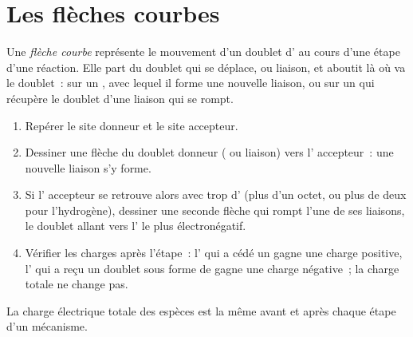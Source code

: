 \section{Les flèches courbes}

\begin{definition}\label{def:g12:curly-arrows:curly-arrow}
Une \emph{flèche courbe} représente le mouvement
d'un doublet d' au cours d'une étape d'une réaction. Elle part
du doublet qui se déplace,  ou liaison, et aboutit là
où va le doublet~: sur un , avec lequel il forme une nouvelle
liaison, ou sur un  qui récupère le doublet d'une liaison qui se
rompt.
\end{definition}

\begin{method}\label{met:g12:curly-arrows:drawing}
\begin{enumerate}
  \item Repérer le site donneur et le site accepteur.
  \item Dessiner une flèche du doublet donneur ( ou
        liaison) vers l' accepteur~: une nouvelle liaison s'y forme.
  \item Si l' accepteur se retrouve alors avec trop d'
        (plus d'un octet, ou plus de deux pour l'hydrogène), dessiner une
        seconde flèche qui rompt l'une de ses liaisons, le doublet allant
        vers l' le plus électronégatif.
  \item Vérifier les charges après l'étape~: l' qui a cédé un
         gagne une charge positive, l' qui a reçu
        un doublet sous forme de  gagne une charge
        négative~; la charge totale ne change pas.
\end{enumerate}
\end{method}

\begin{proposition}\label{prop:g12:curly-arrows:charge}
La charge électrique totale des espèces est la même avant et après
chaque étape d'un mécanisme.
\end{proposition}

